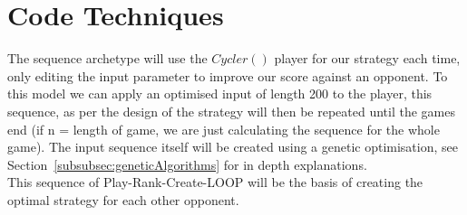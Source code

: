 \section{Code Techniques}\label{sec:codeTechniques}
The sequence archetype will use the \(Cycler()\) player for our strategy each time, only editing the input parameter to improve our score against an opponent.
To this model we can apply an optimised input of length 200 to the player, this sequence, as per the design of the strategy will then be repeated until the games end (if n = length of game, we are just calculating the sequence for the whole game).
The input sequence itself will be created using a genetic optimisation, see Section~\ref{subsubsec:geneticAlgorithms} for in depth
explanations.\\

This sequence of Play-Rank-Create-LOOP will be the basis of creating the optimal strategy for each other opponent.

